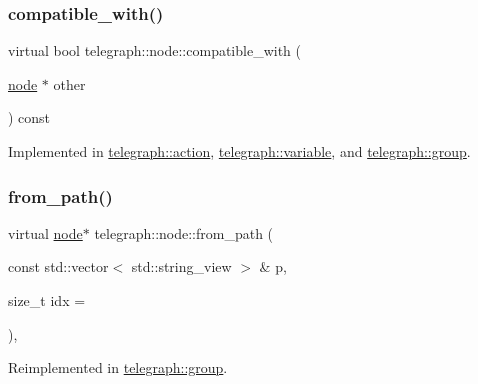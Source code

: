 \subsubsection{\texorpdfstring{compatible\+\_\+with()}{compatible\_with()}}
{\footnotesize\ttfamily virtual bool telegraph\+::node\+::compatible\+\_\+with (\begin{DoxyParamCaption}\item[{\hyperlink{classtelegraph_1_1node}{node} $\ast$}]{other }\end{DoxyParamCaption}) const\hspace{0.3cm}{\ttfamily [pure virtual]}}



Implemented in \hyperlink{classtelegraph_1_1action_a372bd4f9c1b7b4698e151448d5c28af9}{telegraph\+::action}, \hyperlink{classtelegraph_1_1variable_a4075427712d7286318b8ee7bb8c207b8}{telegraph\+::variable}, and \hyperlink{classtelegraph_1_1group_a63cf8362b39b718e9553a519485f7875}{telegraph\+::group}.

\mbox{\label{classtelegraph_1_1node_a2d5ea5366a04f3b3841de9bc21e70416}} 
\subsubsection{\texorpdfstring{from\+\_\+path()}{from\_path()}\hspace{0.1cm}{\footnotesize\ttfamily [1/2]}}
{\footnotesize\ttfamily virtual \hyperlink{classtelegraph_1_1node}{node}$\ast$ telegraph\+::node\+::from\+\_\+path (\begin{DoxyParamCaption}\item[{const std\+::vector$<$ std\+::string\+\_\+view $>$ \&}]{p,  }\item[{size\+\_\+t}]{idx = {} }\end{DoxyParamCaption})\hspace{0.3cm}{\ttfamily [inline]}, {\ttfamily [virtual]}}



Reimplemented in \hyperlink{classtelegraph_1_1group_a27e8f2ecfe0b87fef8ca57c43fda8809}{telegraph\+::group}.

\mbox{\label{classtelegraph_1_1node_aaba33e2aa28a99dcd8f4b1888c3a5706}} 
